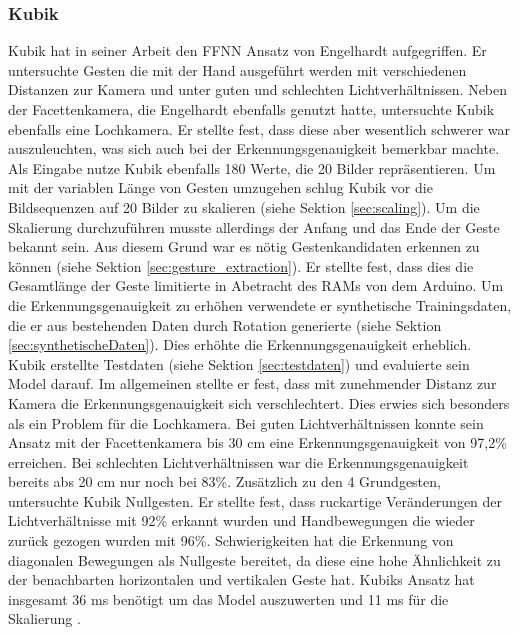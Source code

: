 \subsubsection{Kubik}
Kubik hat in seiner Arbeit den FFNN Ansatz von Engelhardt aufgegriffen. Er untersuchte Gesten die mit der Hand ausgeführt werden mit verschiedenen Distanzen zur Kamera und unter guten und schlechten Lichtverhältnissen.
Neben der Facettenkamera, die Engelhardt ebenfalls genutzt hatte, untersuchte Kubik ebenfalls eine Lochkamera. Er stellte fest, dass diese aber wesentlich schwerer war auszuleuchten, was sich auch bei der
Erkennungsgenauigkeit bemerkbar machte. Als Eingabe nutze Kubik ebenfalls 180 Werte, die 20 Bilder repräsentieren. Um mit der variablen Länge von Gesten umzugehen schlug Kubik vor die Bildsequenzen auf 20 Bilder zu
skalieren (siehe Sektion \ref{sec:scaling}). Um die Skalierung durchzuführen musste allerdings der Anfang und das Ende der Geste bekannt sein. Aus diesem Grund war es nötig Gestenkandidaten erkennen zu können (siehe
Sektion \ref{sec:gesture_extraction}). Er stellte fest, dass dies die Gesamtlänge der Geste limitierte in Abetracht des RAMs von dem Arduino. Um die Erkennungsgenauigkeit zu erhöhen verwendete er synthetische
Trainingsdaten, die er aus bestehenden Daten durch Rotation generierte (siehe Sektion \ref{sec:synthetischeDaten}). Dies erhöhte die Erkennungsgenauigkeit erheblich. Kubik erstellte Testdaten (siehe
Sektion \ref{sec:testdaten}) und evaluierte sein Model darauf. Im allgemeinen stellte er fest, dass mit zunehmender Distanz zur Kamera die Erkennungsgenauigkeit sich verschlechtert. Dies erwies sich besonders als ein
Problem für die Lochkamera. Bei guten Lichtverhältnissen konnte sein Ansatz mit der Facettenkamera bis 30 cm eine Erkennungsgenauigkeit von 97,2\% erreichen. Bei schlechten Lichtverhältnissen war die Erkennungsgenauigkeit
bereits abs 20 cm nur noch bei 83\%. Zusätzlich zu den 4 Grundgesten, untersuchte Kubik Nullgesten. Er stellte fest, dass ruckartige Veränderungen der Lichtverhältnisse mit 92\% erkannt wurden und Handbewegungen die wieder
zurück gezogen wurden mit 96\%. Schwierigkeiten hat die Erkennung von diagonalen Bewegungen als Nullgeste bereitet, da diese eine hohe Ähnlichkeit zu der benachbarten horizontalen und vertikalen Geste hat. Kubiks Ansatz
hat insgesamt 36 ms benötigt um das Model auszuwerten und 11 ms für die Skalierung \cite{kubikThesis}.
